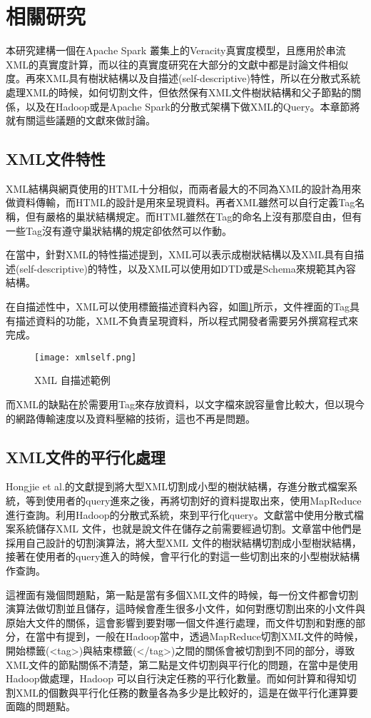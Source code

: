 \section{相關研究}
本研究建構一個在Apache Spark 叢集上的Veracity真實度模型，且應用於串流XML的真實度計算，而以往的真實度研究在大部分的文獻中都是討論文件相似度。再來XML具有樹狀結構以及自描述(self-descriptive)特性，所以在分散式系統處理XML的時候，如何切割文件，但依然保有XML文件樹狀結構和父子節點的關係，以及在Hadoop或是Apache Spark的分散式架構下做XML的Query。本章節將就有關這些議題的文獻來做討論。
\subsection{XML文件特性}
XML結構與網頁使用的HTML十分相似，而兩者最大的不同為XML的設計為用來做資料傳輸，而HTML的設計是用來呈現資料。再者XML雖然可以自行定義Tag名稱，但有嚴格的巢狀結構規定。而HTML雖然在Tag的命名上沒有那麼自由，但有一些Tag沒有遵守巢狀結構的規定卻依然可以作動。\\\par
在\cite{w3sxml}\cite{2005xml}當中，針對XML的特性描述提到，XML可以表示成樹狀結構以及XML具有自描述(self-descriptive)的特性，以及XML可以使用如DTD或是Schema來規範其內容結構。\\\par
在自描述性中，XML可以使用標籤描述資料內容，如圖\ref{self}所示，文件裡面的Tag具有描述資料的功能，XML不負責呈現資料，所以程式開發者需要另外撰寫程式來完成。

\begin{figure}[H]
\centering
\graphicspath{{/Users/FUDA/Documents/masterThesis/image/}}
\texttt{[image: xmlself.png]}
\caption{XML 自描述範例}
\label{self}
\end{figure}
而XML的缺點在於需要用Tag來存放資料，以文字檔來說容量會比較大，但以現今的網路傳輸速度以及資料壓縮的技術，這也不再是問題。
\subsection{XML文件的平行化處理}
Hongjie et al.的文獻\cite{fan2018handling}提到將大型XML切割成小型的樹狀結構，存進分散式檔案系統，等到使用者的query進來之後，再將切割好的資料提取出來，使用MapReduce進行查詢。利用Hadoop的分散式系統，來到平行化query。文獻當中使用分散式檔案系統儲存XML 文件，也就是說文件在儲存之前需要經過切割。文章當中他們是採用自己設計的切割演算法，將大型XML 文件的樹狀結構切割成小型樹狀結構，接著在使用者的query進入的時候，會平行化的對這一些切割出來的小型樹狀結構作查詢。\\\par
這裡面有幾個問題點，第一點是當有多個XML文件的時候，每一份文件都會切割演算法做切割並且儲存，這時候會產生很多小文件，如何對應切割出來的小文件與原始大文件的關係，這會影響到要對哪一個文件進行處理，而文件切割和對應的部分，在\cite{eiffcientXML}當中有提到，一般在Hadoop當中，透過MapReduce切割XML文件的時候，開始標籤(<tag>)與結束標籤(</tag>)之間的關係會被切割到不同的部分，導致XML文件的節點關係不清楚，第二點是文件切割與平行化的問題，在\cite{fan2018handling}當中是使用Hadoop做處理，Hadoop 可以自行決定任務的平行化數量。而如何計算和得知切割XML的個數與平行化任務的數量各為多少是比較好的，這是在做平行化運算要面臨的問題點。\\\par

